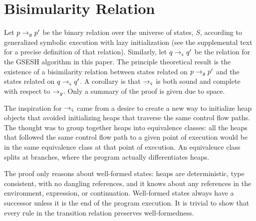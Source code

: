 \section{Bisimularity Relation}
Let $p \rightarrow_{g} p^\prime$ be the binary relation over the universe of states, $S$,
according to generalized symbolic execution with lazy initialization
(see the supplemental text for a precise definition of that
relation). Similarly, let $q \rightarrow_{\varsigma} q^\prime$ be the relation for the GSESH
algorithm in this paper. The principle theoretical result is the
existence of a bisimilarity relation between states related on $p \rightarrow_{g} p^\prime$
and the states related on $q \rightarrow_{\varsigma} q^\prime$. A corollary is that $\rightarrow_{\varsigma}$ is
both sound and complete with respect to $\rightarrow_{g}$. Only a summary of the
proof is given due to space.

The inspiration for $\rightarrow_{\varsigma}$ came from a desire to create
a new way to initialize heap objects that avoided initializing heaps
that traverse the same control flow paths. The thought was to group together heaps
into equivalence classes: all the heaps that followed the same control
flow path to a given point of execution would be in the same
equivalence class at that point of execution. An equivalence class
splits at branches, where the program actually differentiates heaps.

The proof only reasons about well-formed states: heaps are
deterministic, type consistent, with no dangling references, and it
knows about any references in the environment, expression, or
continuation. Well-formed states always have a successor unless it is
the end of the program execution. It is trivial to show that every
rule in the transition relation preserves well-formedness.

